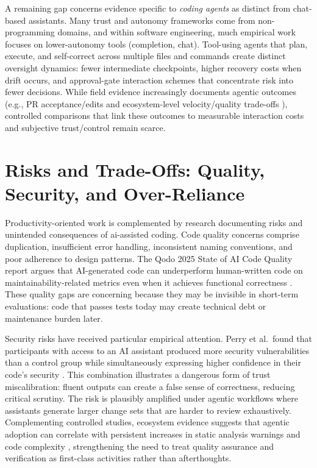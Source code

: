 A remaining gap concerns evidence specific to \emph{coding agents} as distinct from chat-based assistants. Many trust and autonomy frameworks come from non-programming domains, and within software engineering, much empirical work focuses on lower-autonomy tools (completion, chat). Tool-using agents that plan, execute, and self-correct across multiple files and commands create distinct oversight dynamics: fewer intermediate checkpoints, higher recovery costs when drift occurs, and approval-gate interaction schemes that concentrate risk into fewer decisions. While field evidence increasingly documents agentic outcomes (e.g., PR acceptance/edits \parencite{watanabe2025agenticPR} and ecosystem-level velocity/quality trade-offs \parencite{he2025cursorDID}), controlled comparisons that link these outcomes to measurable interaction costs and subjective trust/control remain scarce.

\section{Risks and Trade-Offs: Quality, Security, and Over-Reliance}

\label{sec:rw-risks}

Productivity-oriented work is complemented by research documenting risks and unintended consequences of \gls{ai}-assisted coding. Code quality concerns comprise duplication, insufficient error handling, inconsistent naming conventions, and poor adherence to design patterns. The Qodo 2025 State of AI Code Quality report argues that AI-generated code can underperform human-written code on maintainability-related metrics even when it achieves functional correctness \parencite{qodo2025codequality}. These quality gaps are concerning because they may be invisible in short-term evaluations: code that passes tests today may create technical debt or maintenance burden later.

Security risks have received particular empirical attention. Perry et al.\ found that participants with access to an AI assistant produced more security vulnerabilities than a control group while simultaneously expressing higher confidence in their code’s security \parencite{perry2023insecure}. This combination illustrates a dangerous form of trust miscalibration: fluent outputs can create a false sense of correctness, reducing critical scrutiny. The risk is plausibly amplified under agentic workflows where assistants generate larger change sets that are harder to review exhaustively. Complementing controlled studies, ecosystem evidence suggests that agentic adoption can correlate with persistent increases in static analysis warnings and code complexity \parencite{he2025cursorDID}, strengthening the need to treat quality assurance and verification as first-class activities rather than afterthoughts.

